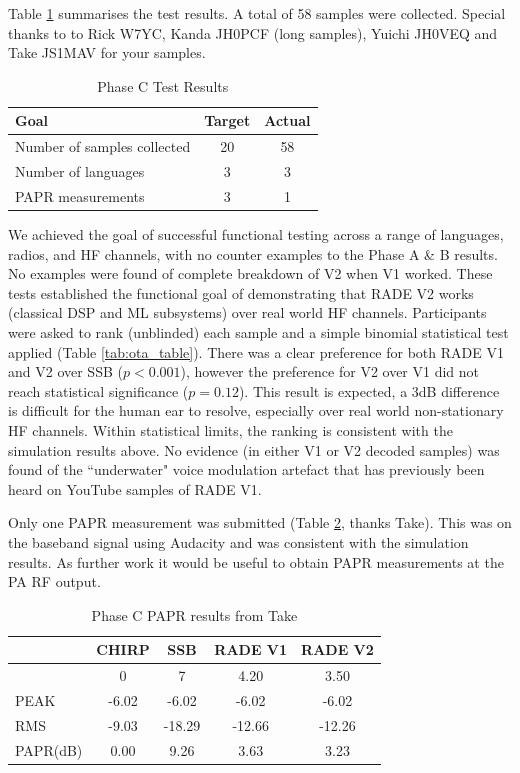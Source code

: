 \documentclass{article}
\begin{document}
Table \ref{tab:phase_c_summary} summarises the test results. A total of 58 samples were collected.  Special thanks to to Rick W7YC, Kanda JH0PCF (long samples), Yuichi JH0VEQ and Take JS1MAV for your samples.
 
\begin{table} [h]
\caption{Phase C Test Results}
\label{tab:phase_c_summary}
\centering
\begin{tabular}{ l | c | c }
 \hline
 Goal & Target & Actual \\
 \hline
 Number of samples collected & 20 & 58 \\
 Number of languages & 3 & 3 \\
 PAPR measurements & 3 & 1 \\
 \hline
 \hline
\end{tabular}
\end{table}

We achieved the goal of successful functional testing across a range of languages, radios, and HF channels, with no counter examples to the Phase A \& B results.
No examples were found of complete breakdown of V2 when V1 worked.
These tests established the functional goal of demonstrating that RADE V2 works (classical DSP and ML subsystems) over real world HF channels.
Participants were asked to rank (unblinded) each sample and a simple binomial statistical test applied (Table \ref{tab:ota_table}).
There was a clear preference for both RADE V1 and V2 over SSB ($p < 0.001$), however the preference for V2 over V1 did not reach statistical significance ($p = 0.12$).
This result is expected, a 3dB difference is difficult for the human ear to resolve, especially over real world non-stationary HF channels.
Within statistical limits, the ranking is consistent with the simulation results above.
No evidence (in either V1 or V2 decoded samples) was found of the ``underwater" voice modulation artefact that has previously been heard on YouTube samples of RADE V1.



Only one PAPR measurement was submitted (Table \ref{tab:phase_c_take_papr}, thanks Take). This was on the baseband signal using Audacity and was consistent with the simulation results. As further work it would be useful to obtain PAPR measurements at the PA RF output.

\begin{table} [h]
\caption{Phase C PAPR results from Take}
\label{tab:phase_c_take_papr}
\centering
\begin{tabular}{ l | c | c | c | c}
 \hline	
      & CHIRP & SSB & RADE V1 & RADE V2 \\
 \hline
      & 0 & 7 & 4.20 & 3.50	\\
 PEAK & -6.02 & -6.02 & -6.02 & -6.02 \\	
 RMS & -9.03 & -18.29 & -12.66 & -12.26 \\
 PAPR(dB) & 0.00 & 9.26 & 3.63 & 3.23 \\
 \hline
\end{tabular}
\end{table}
\end{document}
